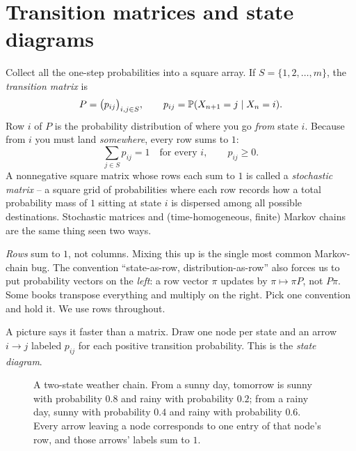 \section{Transition matrices and state diagrams}
\label{ch23:transition-matrix}

Collect all the one-step probabilities into a square array. If $S = \{1, 2, \dots, m\}$, the
\emph{transition matrix} is
\[
  P = \big(p_{ij}\big)_{i,j \in S},
  \qquad p_{ij} = \operatorname{\mathbb{P}}(X_{n+1} = j \mid X_n = i).
\]
Row $i$ of $P$ is the probability distribution of where you go \emph{from} state $i$. Because
from $i$ you must land \emph{somewhere}, every row sums to $1$:
\[
  \sum_{j \in S} p_{ij} = 1 \quad \text{for every } i, \qquad p_{ij} \ge 0.
\]
A nonnegative square matrix whose rows each sum to $1$ is called a \emph{stochastic matrix} --
a square grid of probabilities where each row records how a total probability mass of $1$
sitting at state $i$ is dispersed among all possible destinations. Stochastic matrices and
(time-homogeneous, finite) Markov chains are the same thing seen two ways.

\begin{trapbox}
\emph{Rows} sum to $1$, not columns. Mixing this up is the single most common Markov-chain
bug. The convention ``state-as-row, distribution-as-row'' also forces us to put probability
vectors on the \emph{left}: a row vector $\pi$ updates by $\pi \mapsto \pi P$, not $P\pi$.
Some books transpose everything and multiply on the right. Pick one convention and hold it.
We use rows throughout.
\end{trapbox}

A picture says it faster than a matrix. Draw one node per state and an arrow $i \to j$
labeled $p_{ij}$ for each positive transition probability. This is the \emph{state diagram}.

\begin{figure}[H]
\centering
{}
\caption{A two-state weather chain. From a sunny day, tomorrow is sunny with probability
$0.8$ and rainy with probability $0.2$; from a rainy day, sunny with probability $0.4$ and
rainy with probability $0.6$. Every arrow leaving a node corresponds to one entry of that
node's row, and those arrows' labels sum to $1$.}
\label{ch23:fig-weather-diagram}
\end{figure}


